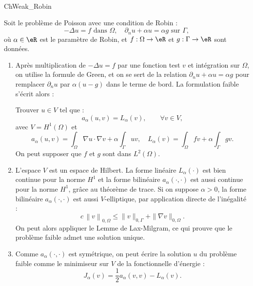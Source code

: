 \medskip

\begin{corrige}{ChWeak_Robin}

Soit le problème de Poisson avec une condition de Robin :
\begin{equation*} %
- \Delta u = f \mbox{ dans } \Omega, \quad \partial_n u + \alpha u = \alpha g \mbox{ sur } \Gamma,
\end{equation*}
où $\alpha \in \eR$ est le paramètre de Robin, et $f : \Omega \rightarrow \eR$ et $g : \Gamma \rightarrow \eR$ sont données.

\begin{enumerate}

\item Après multiplication de $-\Delta u = f$ par une fonction test $v$ et intégration sur $\Omega$, on utilise la formule de Green, et on se sert de la relation $\partial_n u + \alpha u = \alpha g$ pour remplacer $\partial_n u$ par $\alpha (u-g)$ dans le terme de bord. La formulation faible s'écrit alors :

\medskip
Trouver $u\in V$ tel que :
\[
a_\alpha ( u , v ) = L_\alpha (v), \qquad \forall v \in V,
\]
avec $V = H^1(\Omega)$ et 
\[
a_\alpha ( u , v ) = \int_\Omega \nabla u \cdot \nabla v 
+ \alpha \int_\Gamma u v, \quad
L_\alpha ( v ) = \int_\Omega f v + \alpha \int_\Gamma g v.
\]
On peut supposer que $f$ et $g$ sont dans $L^2(\Omega)$.

\item L'espace $V$ est un espace de Hilbert. La forme linéaire $L_\alpha (\cdot)$ est bien continue pour la norme $H^1$ et la forme bilinéaire $a_\alpha (\cdot , \cdot)$ est aussi continue pour la norme $H^1$, grâce au théorème de trace. Si on suppose $\alpha > 0$, la forme bilinéaire $a_\alpha(\cdot,\cdot)$ est aussi $V$-elliptique, par application directe de l'inégalité :
\[
c \, \left \| v \right \|_{0,\Omega} \leq \| v \|_{0,\Gamma}+ \| \nabla v \|_{0,\Omega}.
\]
On peut alors appliquer le Lemme de Lax-Milgram, ce qui prouve que le problème faible admet une solution unique.

\item Comme $a_\alpha ( \cdot , \cdot)$ est symétrique, on peut écrire la solution $u$ du problème faible comme le minimiseur sur $V$ de la fonctionnelle d'énergie :
\[
J_\alpha ( v ) = \frac12 a_\alpha ( v , v ) - L_\alpha (v).
\]


\end{enumerate}
\end{corrige}

